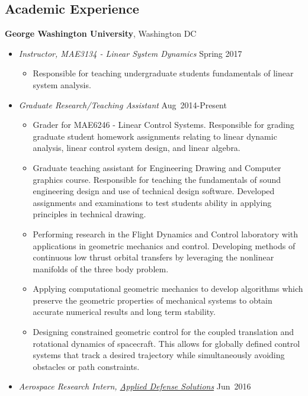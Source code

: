 \subsection*{Academic Experience}

\textbf{George Washington University}, Washington DC
    \begin{itemize}
        \item[] \textit{Instructor, MAE3134 - Linear System Dynamics} \hfill {Spring 2017}
        \begin{itemize}
            \item Responsible for teaching undergraduate students fundamentals of linear system analysis. 
        \end{itemize}
        \item[] \textit{Graduate Research/Teaching Assistant} \hfill {Aug~2014-Present}
        \begin{itemize}
            \item Grader for MAE6246 - Linear Control Systems. 
            Responsible for grading graduate student homework assignments relating to linear dynamic analysis, linear control system design, and linear algebra. 
            \item Graduate teaching assistant for Engineering Drawing and Computer graphics course.
            Responsible for teaching the fundamentals of sound engineering design and use of technical design software.
            Developed assignments and examinations to test students ability in applying principles in technical drawing.
            \item Performing research in the Flight Dynamics and Control laboratory with applications in geometric mechanics and control. 
            Developing methods of continuous low thrust orbital transfers by leveraging the nonlinear manifolds of the three body problem.
            \item Applying computational geometric mechanics to develop algorithms which preserve the geometric properties of mechanical systems to obtain accurate numerical results and long term stability.
            \item Designing constrained geometric control for the coupled translation and rotational dynamics of spacecraft.
            This allows for globally defined control systems that track a desired trajectory while simultaneously avoiding obstacles or path constraints.
        \end{itemize}
        \item[] \textit{Aerospace Research Intern, \href{http://www.applieddefense.com/}{Applied Defense Solutions}} \hfill {Jun~2016}

\end{itemize}
